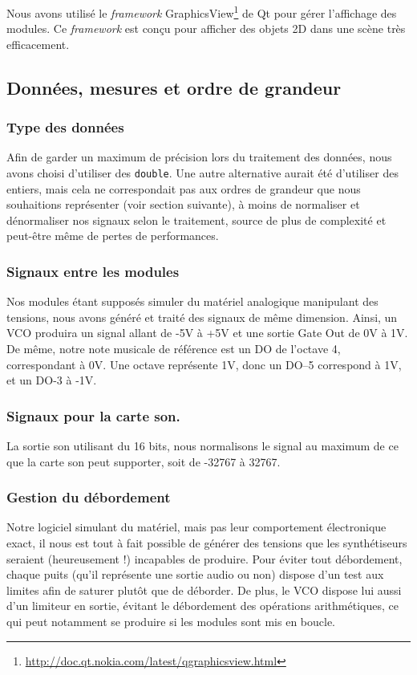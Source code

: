 Nous avons utilisé le \emph{framework} GraphicsView\footnote{\url{http://doc.qt.nokia.com/latest/qgraphicsview.html}} de Qt pour
gérer l'affichage des modules. Ce \emph{framework} est conçu pour
afficher des objets 2D dans une scène très efficacement.


\subsection{Données, mesures et ordre de grandeur}

\subsubsection{Type des données}

Afin de garder un maximum de précision lors du traitement des
données, nous avons choisi d'utiliser des \verb!double!. Une autre
alternative aurait été d'utiliser des entiers, mais cela ne
correspondait pas aux ordres de grandeur que nous souhaitions
représenter (voir section suivante), à moins de normaliser et
dénormaliser nos signaux selon le traitement, source de plus de
complexité et peut-être même de pertes de performances.

\subsubsection{Signaux entre les modules}

Nos modules étant supposés simuler du matériel analogique
manipulant des tensions, nous avons généré et traité des signaux de
même dimension. Ainsi, un VCO produira un signal allant de -5V à
+5V et une sortie Gate Out de 0V à 1V. De même, notre note musicale
de référence est un DO de l'octave 4, correspondant à 0V. Une
octave représente 1V, donc un DO--5 correspond à 1V, et un DO-3 à
-1V.

\subsubsection{Signaux pour la carte son.}

La sortie son utilisant du 16 bits, nous normalisons le signal au
maximum de ce que la carte son peut supporter, soit de -32767 à
32767.

\subsubsection{Gestion du débordement}

Notre logiciel simulant du matériel, mais pas leur comportement
électronique exact, il nous est tout à fait possible de générer des
tensions que les synthétiseurs seraient (heureusement !) incapables
de produire. Pour éviter tout débordement, chaque puits (qu'il
représente une sortie audio ou non) dispose d'un test aux limites afin de saturer
plutôt que de déborder. De plus, le VCO dispose lui aussi d'un
limiteur en sortie, évitant le débordement des opérations
arithmétiques, ce qui peut notamment se produire si les modules sont mis en boucle.

